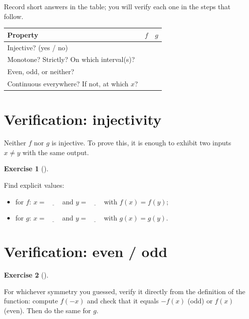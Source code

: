 \documentclass[
  letterpaper,
  DIV=11,
  numbers=noendperiod]{scrreprt}
\newcounter{none} %
\providecommand{\tightlist}{%
  \setlength{\itemsep}{0pt}\setlength{\parskip}{0pt}}
\theoremstyle{plain}
\theoremstyle{plain}
\theoremstyle{definition}
\theoremstyle{definition}
\newtheorem{exercise}{Exercise}[chapter]
\theoremstyle{definition}
\theoremstyle{plain}
\theoremstyle{plain}
\theoremstyle{remark}
\begin{document}
Record short answers in the table; you will verify each one in the steps
that follow.

{\def\LTcaptype{none} %
\begin{longtable}[]{@{}lll@{}}
\toprule\noalign{}
Property & \(f\) & \(g\) \\
\midrule\noalign{}
\endhead
\bottomrule\noalign{}
\endlastfoot
Injective? (yes / no) & ~ & ~ \\
Monotone? Strictly? On which interval(s)? & ~ & ~ \\
Even, odd, or neither? & ~ & ~ \\
Continuous everywhere? If not, at which \(x\)? & ~ & ~ \\
\end{longtable}
}

\section{Verification: injectivity}\label{verification-injectivity}

Neither \(f\) nor \(g\) is injective. To prove this, it is enough to
exhibit two inputs \(x \neq y\) with the same output.

\begin{exercise}[]\protect\hypertarget{exr-activity-injective}{}\label{exr-activity-injective}

Find explicit values:

\begin{itemize}
\tightlist
\item
  for \(f\): \(x = \underline{\qquad}\) and \(y = \underline{\qquad}\)
  with \(f(x) = f(y)\);
\item
  for \(g\): \(x = \underline{\qquad}\) and \(y = \underline{\qquad}\)
  with \(g(x) = g(y)\).
\end{itemize}

\end{exercise}

\section{Verification: even / odd}\label{verification-even-odd}

\begin{exercise}[]\protect\hypertarget{exr-activity-even-odd}{}\label{exr-activity-even-odd}

For whichever symmetry you guessed, verify it directly from the
definition of the function: compute \(f(-x)\) and check that it equals
\(-f(x)\) (odd) or \(f(x)\) (even). Then do the same for \(g\).

\end{exercise}
\end{document}
